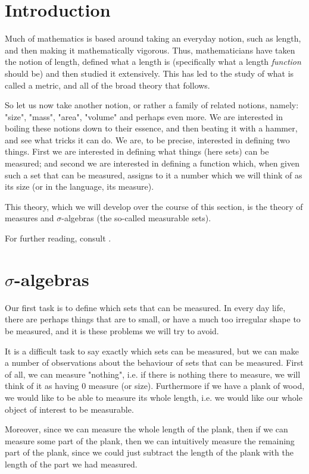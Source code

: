 \documentclass[../../textbook.tex]{subfiles}
\begin{document}
\section{Introduction}
Much of mathematics is based around taking an everyday notion, such as length, and then making it mathematically vigorous. Thus, mathematicians have taken the notion of length, defined what a length is (specifically what a length \emph{function} should be) and then studied it extensively. This has led to the study of what is called a metric, and all of the broad theory that follows.

So let us now take another notion, or rather a family of related notions, namely: "size", "mass", "area", "volume" and perhaps even more. We are interested in boiling these notions down to their essence, and then beating it with a hammer, and see what tricks it can do. We are, to be precise, interested in defining two things. First we are interested in defining what things (here sets) can be measured; and second we are interested in defining a function which, when given such a set that can be measured, assigns to it a number which we will think of as its size (or in the language, its measure).

This theory, which we will develop over the course of this section, is the theory of measures and $\sigma$-algebras (the so-called measurable sets).

For further reading, consult \autocite{schilling2017measures}.

\section{$\sigma$-algebras}

Our first task is to define which sets that can be measured. In every day life, there are perhaps things that are to small, or have a much too irregular shape to be measured, and it is these problems we will try to avoid.

It is a difficult task to say exactly which sets can be measured, but we can make a number of observations about the behaviour of sets that can be measured. First of all, we can measure "nothing", i.e. if there is nothing there to measure, we will think of it as having 0 measure (or size). Furthermore if we have a plank of wood, we would like to be able to measure its whole length, i.e. we would like our whole object of interest to be measurable.

Moreover, since we can measure the whole length of the plank, then if we can measure some part of the plank, then we can intuitively measure the remaining part of the plank, since we could just subtract the length of the plank with the length of the part we had measured.
\end{document}
